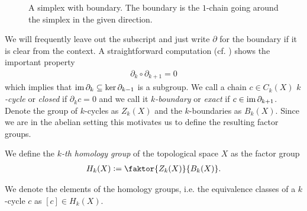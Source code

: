 \documentclass[../master_thesis.tex]{subfiles}
\begin{document}
\begin{figure}\centering
    \scalebox{2}{
        \begin{tikzpicture}
            \path [draw=black,postaction={on each segment={mid arrow=black}}]
                (-1,0) -- (1,0) -- (0,1.73205) -- (-1,0) --cycle;
        \end{tikzpicture}
    }
    \caption{A simplex with boundary. The boundary is the $1$-chain going around 
    the simplex in the given direction.}
    \label{fig:simplex_with_boundary}
\end{figure}


We will frequently leave out the subscript and just write $\partial$ for the boundary 
if it is clear from the context.
A straightforward computation (cf. \cite[Lemma 1.6]{topology_and_geometry}) shows the 
important property 
\begin{align*}
    \partial_k \circ \partial_{k+1} = 0
\end{align*}
which implies that $\operatorname{im} \partial_k\subseteq \ker \partial_{k-1}$ is 
a subgroup. We call a chain $c \in C_k(X)$ \textit{$k$-cycle} or \textit{closed} if $\partial_k c = 0$ and 
we call it \textit{$k$-boundary} or \textit{exact} if $c \in \operatorname{im} \partial_{k+1}$. 
Denote the group of $k$-cycles as $Z_k(X)$ and the $k$-boundaries as $B_k(X)$.
Since we are in the abelian setting this motivates us to define 
the resulting factor groups.
\begin{definition}
    We define the \textit{$k$-th homology group} of the topological space $X$ as the factor group
    \begin{align*}
        H_k(X) \vcentcolon= \faktor{Z_k(X)}{B_k(X)}.
    \end{align*} 
\end{definition}
We denote the elements of the homology groups, i.e. the equivalence classes of a 
$k$-cycle $c$ as $[c] \in H_k(X)$.
\end{document}
